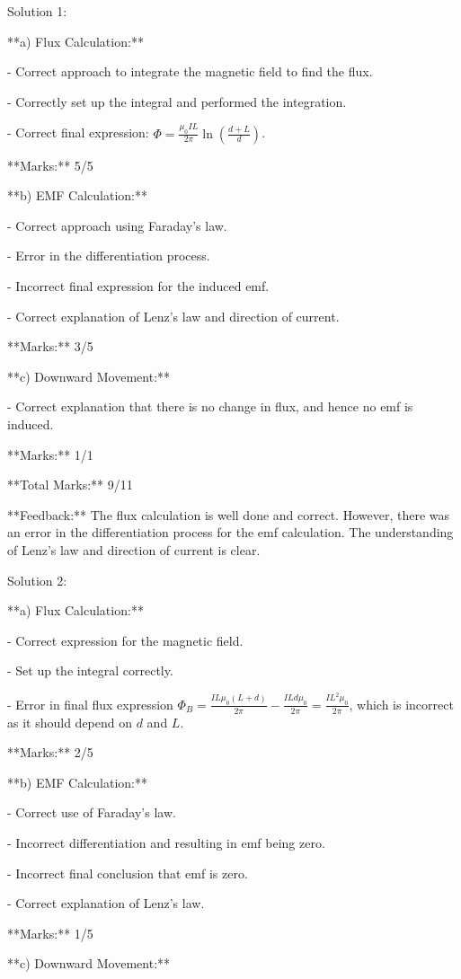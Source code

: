 \documentclass[a4paper,11pt]{article}
\begin{document}
Solution 1:

**a) Flux Calculation:**

- Correct approach to integrate the magnetic field to find the flux.

- Correctly set up the integral and performed the integration.

- Correct final expression: \(\Phi = \frac{\mu_0 I L}{2 \pi} \ln\left(\frac{d+L}{d}\right)\).

**Marks:** 5/5

**b) EMF Calculation:**

- Correct approach using Faraday's law.

- Error in the differentiation process.

- Incorrect final expression for the induced emf.

- Correct explanation of Lenz's law and direction of current.

**Marks:** 3/5

**c) Downward Movement:**

- Correct explanation that there is no change in flux, and hence no emf is induced.

**Marks:** 1/1

**Total Marks:** 9/11

**Feedback:** The flux calculation is well done and correct. However, there was an error in the differentiation process for the emf calculation. The understanding of Lenz's law and direction of current is clear.

Solution 2:

**a) Flux Calculation:**

- Correct expression for the magnetic field.

- Set up the integral correctly.

- Error in final flux expression \(\Phi_B = \frac{I L \mu_0 (L + d)}{2 \pi} - \frac{I L d \mu_0}{2 \pi} = \frac{I L^2 \mu_0}{2 \pi}\), which is incorrect as it should depend on \(d\) and \(L\).

**Marks:** 2/5

**b) EMF Calculation:**

- Correct use of Faraday's law.

- Incorrect differentiation and resulting in emf being zero.

- Incorrect final conclusion that emf is zero.

- Correct explanation of Lenz's law.

**Marks:** 1/5

**c) Downward Movement:**
\end{document}
